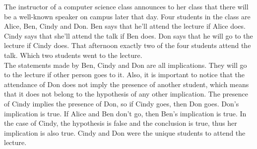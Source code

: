\documentclass[12pt]{article}
\newenvironment{problem}[2][Problem]{\begin{trivlist}
		\item[\hskip \labelsep {\bfseries #1}\hskip \labelsep {\bfseries #2.}]}{\end{trivlist}}
\begin{document}
\begin{problem}{27}
	The instructor of a computer science class announces to her class that there will be a well-known speaker on campus later that day. Four students in the class are Alice, Ben, Cindy and Don. Ben says that he'll attend the lecture if Alice does. Cindy says that she'll attend the talk if Ben does. Don says that he will go to the lecture if Cindy does. That afternoon exactly two of the four students attend the talk. Which two students went to the lecture. \\
	
	The statements made by Ben, Cindy and Don are all implications. They will go to the lecture if other person goes to it. Also, it is important to notice that the attendance of Don does not imply the presence of another student, which means that it does not belong to the hypothesis of any other implication. The presence of Cindy implies the presence of Don, so if Cindy goes, then Don goes. Don's implication is true. If Alice and Ben don't go, then Ben's implication is true. In the case of Cindy, the hypothesis is false and the conclusion is true, thus her implication is also true. Cindy and Don were the unique students to attend the lecture.
\end{problem}
\end{document}
